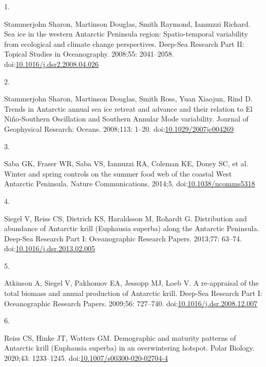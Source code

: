 \documentclass[
]{article}
\newlength{\cslhangindent}
\newlength{\csllabelwidth}
\newlength{\cslentryspacingunit} %
\newenvironment{CSLReferences}[2] %
 {%
  \setlength{\parindent}{0pt}
  \ifodd #1
  \let\oldpar\par
  \def\par{\hangindent=\cslhangindent\oldpar}
  \fi
  \setlength{\parskip}{#2\cslentryspacingunit}
 }%
 {}
\newcommand{\CSLLeftMargin}[1]{\parbox[t]{\csllabelwidth}{#1}}
\newcommand{\CSLRightInline}[1]{\parbox[t]{\linewidth - \csllabelwidth}{#1}\break}
\begin{document}
\begin{CSLReferences}{0}{0}
\leavevmode{}%
\CSLLeftMargin{1. }%
\CSLRightInline{Stammerjohn Sharon, Martinson Douglas, Smith Raymond,
Iannuzzi Richard. {Sea ice in the western Antarctic Peninsula region:
Spatio-temporal variability from ecological and climate change
perspectives}. Deep-Sea Research Part II: Topical Studies in
Oceanography. 2008;55: 2041--2058.
doi:\href{https://doi.org/10.1016/j.dsr2.2008.04.026}{10.1016/j.dsr2.2008.04.026}}

\leavevmode{}%
\CSLLeftMargin{2. }%
\CSLRightInline{Stammerjohn Sharon, Martinson Douglas, Smith Ross, Yuan
Xiaojun, Rind D. {Trends in Antarctic annual sea ice retreat and advance
and their relation to El Ni{ñ}o-Southern Oscillation and Southern
Annular Mode variability}. Journal of Geophysical Research: Oceans.
2008;113: 1--20.
doi:\href{https://doi.org/10.1029/2007jc004269}{10.1029/2007jc004269}}

\leavevmode{}%
\CSLLeftMargin{3. }%
\CSLRightInline{Saba GK, Fraser WR, Saba VS, Iannuzzi RA, Coleman KE,
Doney SC, et al. {Winter and spring controls on the summer food web of
the coastal West Antarctic Peninsula}. Nature Communications. 2014;5.
doi:\href{https://doi.org/10.1038/ncomms5318}{10.1038/ncomms5318}}

\leavevmode{}%
\CSLLeftMargin{4. }%
\CSLRightInline{Siegel V, Reiss CS, Dietrich KS, Haraldsson M, Rohardt
G. {Distribution and abundance of Antarctic krill (Euphausia superba)
along the Antarctic Peninsula}. Deep-Sea Research Part I: Oceanographic
Research Papers. 2013;77: 63--74.
doi:\href{https://doi.org/10.1016/j.dsr.2013.02.005}{10.1016/j.dsr.2013.02.005}}

\leavevmode{}%
\CSLLeftMargin{5. }%
\CSLRightInline{Atkinson A, Siegel V, Pakhomov EA, Jessopp MJ, Loeb V.
{A re-appraisal of the total biomass and annual production of Antarctic
krill}. Deep-Sea Research Part I: Oceanographic Research Papers.
2009;56: 727--740.
doi:\href{https://doi.org/10.1016/j.dsr.2008.12.007}{10.1016/j.dsr.2008.12.007}}

\leavevmode{}%
\CSLLeftMargin{6. }%
\CSLRightInline{Reiss CS, Hinke JT, Watters GM. {Demographic and
maturity patterns of Antarctic krill (Euphausia superba) in an
overwintering hotspot}. Polar Biology. 2020;43: 1233--1245.
doi:\href{https://doi.org/10.1007/s00300-020-02704-4}{10.1007/s00300-020-02704-4}}


\end{CSLReferences}
\end{document}
